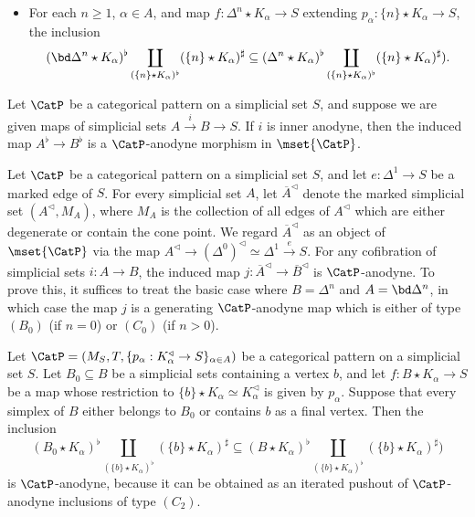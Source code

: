 \begin{definition}
\begin{itemize}
\item[$(C_2)$] For each $n \geq 1$, $\alpha \in A$, and map
$f: \Delta^n \star K_{\alpha} \rightarrow S$ extending $p_{\alpha}: \{n\} \star K_{\alpha} \rightarrow S$,
the inclusion
$$ ( \bd \Delta^n \star K_{\alpha})^{\flat} \coprod_{ ( \{n\} \star K_{\alpha})^{\flat} }
( \{n\} \star K_{\alpha})^{\sharp} \subseteq 
( \Delta^n \star K_{\alpha})^{\flat} \coprod_{ ( \{n\} \star K_{\alpha})^{\flat} }
( \{n\} \star K_{\alpha} )^{\sharp} ).$$
\end{itemize}
\end{definition}

\begin{example}\label{ina}
Let $\CatP$ be a categorical pattern on a simplicial set $S$, and suppose we are given maps of simplicial sets
$A \stackrel{i}{\rightarrow} B \rightarrow S$. If $i$ is inner anodyne, then the induced map
$A^{\flat} \rightarrow B^{\flat}$ is a $\CatP$-anodyne morphism in $\mset{ \CatP}$.
\end{example}

\begin{example}\label{singer}
Let $\CatP$ be a categorical pattern on a simplicial set $S$, and let $e: \Delta^1 \rightarrow S$
be a marked edge of $S$. For every simplicial set $A$, let $\overline{ A}^{\triangleleft}$
denote the marked simplicial set $( A^{\triangleleft}, M_A)$, where $M_A$ is the collection
of all edges of $A^{\triangleleft}$ which are either degenerate or contain the cone point.
We regard $\overline{A}^{\triangleleft}$ as an object of $\mset{ \CatP}$ via the map
$A^{\triangleleft} \rightarrow ( \Delta^0)^{\triangleleft} \simeq \Delta^1 \stackrel{e}{\rightarrow} S$. For any cofibration of simplicial sets $i: A \rightarrow B$, the induced map
$j: \overline{A}^{\triangleleft} \rightarrow \overline{B}^{\triangleleft}$ is $\CatP$-anodyne. 
To prove this, it suffices to treat the basic case where $B = \Delta^n$ and $A = \bd \Delta^n$, in which case the map $j$ is a generating $\CatP$-anodyne map which is either of type
$(B_0)$ (if $n=0$) or $(C_0)$ (if $n > 0$).
\end{example}

\begin{example}\label{urtime}
Let $\CatP = (M_S, T, \{ p_{\alpha}: K_{\alpha}^{\triangleleft} \rightarrow S\}_{\alpha \in A})$
be a categorical pattern on a simplicial set $S$. Let $B_0 \subseteq B$ be a simplicial sets containing
a vertex $b$, and let $f: B \star K_{\alpha} \rightarrow S$ be a map whose restriction to
$\{b\} \star K_{\alpha} \simeq K_{\alpha}^{\triangleleft}$ is given by $p_{\alpha}$.
Suppose that every simplex of $B$ either belongs to $B_0$ or contains $b$ as a final vertex.
Then the inclusion
$$ (B_0 \star K_{\alpha})^{\flat} \coprod_{ ( \{b\} \star K_{\alpha})^{\flat} }
( \{b\} \star K_{\alpha})^{\sharp} \subseteq 
( B \star K_{\alpha})^{\flat} \coprod_{ ( \{b\} \star K_{\alpha})^{\flat} }
( \{b\} \star K_{\alpha} )^{\sharp} )$$
is $\CatP$-anodyne, because it can be obtained as an iterated pushout of $\CatP$-anodyne inclusions of type $(C_2)$.
\end{example}

